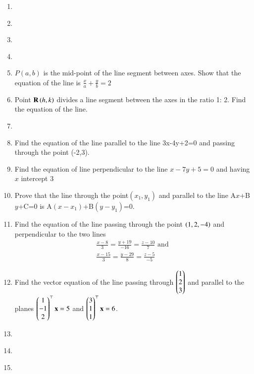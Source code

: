 \begin{enumerate}[label=\thesection.\arabic*,ref=\thesection.\theenumi]
%
\item 
\label{chapters/11/10/2/12}
%
\item 
\label{chapters/11/10/2/13}
%
\item 
\label{chapters/11/10/2/14}
%
\item 
\label{chapters/11/10/2/15}
%
\item 
$P(a,b)$ is the mid-point of the line segment between axes. Show that the equation of the line is $\frac{x}{a}+\frac{y}{b}=2$
\label{chapters/11/10/2/18}
\\
\solution
%
\item Point $\mathbf{R}\left(h, k\right)$ divides a line segment between the axes in the ratio 1: 2. Find the equation of the line.
\label{chapters/11/10/2/19}
%
\item 
\label{chapters/11/10/2/20}
%
\item Find the equation of the line  parallel to the line 3x-4y+2=0 and passing through the point (-2,3).
\label{chapters/11/10/3/7}
%
\item Find the equation of line perpendicular to the line $x-7y+5=0$ and having $x$ intercept $3$\\
\label{chapters/11/10/3/8}
\solution
%
\item Prove that the line through the point$(x_1,y_1)$ and parallel to the line A$x$+B$y$+C=0 is A$(x-x_1)$+B$(y-y_1)$=0.
\label{chapters/11/10/3/11}
\\
\solution
%
	\item Find the equation of the line passing through the point $\left(1,2,-4\right)$ and perpendicular to the two lines
\begin{align}
	\frac{x-8}{3}=\frac{y+19}{-16}=\frac{z-10}{7} \text{ and }\\ \frac{x-15}{3}=\frac{y-29}{8}=\frac{z-5}{-5} 
\end{align}
    \solution
	\item  Find the vector equation of the line passing through $\begin{pmatrix}1\\2\\3\end{pmatrix}$ and parallel to the planes $\begin{pmatrix}1\\-1\\2\end{pmatrix}^{\top}\mathbf{x} = 5$ and $\begin{pmatrix}3\\1\\1\end{pmatrix}^{\top}\mathbf{x} = 6$.  
    \solution
	\item
\label{chapters/11/10/3/12}
\item
%
\item
	\label{12.11.2.3}
 

\end{enumerate}
